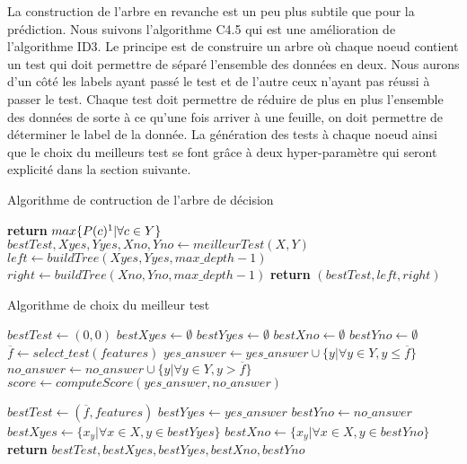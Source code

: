 \documentclass[french, 14pt]{memoir}
\begin{document}
La construction de l'arbre en revanche est un peu plus subtile que pour la prédiction. Nous suivons l'algorithme C4.5 qui est une amélioration de l'algorithme ID3. Le principe est de construire un arbre où chaque noeud contient un test qui doit permettre de séparé l'ensemble des données en deux. Nous aurons d'un côté les labels ayant passé le test et de l'autre ceux n'ayant pas réussi à passer le test. Chaque test doit permettre de réduire de plus en plus l'ensemble des données de sorte à ce qu'une fois arriver à une feuille, on doit permettre de déterminer le label de la donnée. La génération des tests à chaque noeud ainsi que le choix du meilleurs test se font grâce à deux hyper-paramètre qui seront explicité dans la section suivante. 

\begin{algorithm}
\begin{minipage}[t]{20cm}
\caption{Algorithme de contruction de l'arbre de décision}
\label{buildTree}
\begin{algorithmic}[1]
\State \textbf{return} $max\{P(c)\footnote{où P(c) est la probabilité d'apparition de la classe c dans Y}|\forall c \in Y\}$
\Else
\State $bestTest, Xyes, Yyes, Xno, Yno \gets meilleurTest(X, Y)$
\State $left \gets buildTree(Xyes, Yyes, max\_depth - 1)$
\State $right \gets buildTree(Xno, Yno, max\_depth - 1)$
\State \textbf{return} $(bestTest, left, right)$
\EndIf
\EndFunction
\end{algorithmic}
\end{minipage}
\end{algorithm}

\begin{algorithm}
\begin{minipage}[t]{20cm}
\caption{Algorithme de choix du meilleur test}
\label{getBestTest}
\begin{algorithmic}[1]
\State $bestTest \gets (0,0)$
\State $bestXyes \gets \emptyset$
\State $bestYyes \gets \emptyset$
\State $bestXno \gets \emptyset$
\State $bestYno \gets \emptyset$
\State $\overline{f} \gets select\_test(features)$
\State $yes\_answer \gets yes\_answer \cup \{y | \forall y \in Y, y \leq \overline{f} \}$
\State $no\_answer \gets no\_answer \cup \{y | \forall y \in Y, y > \overline{f} \}$
\State $score \gets computeScore(yes\_answer, no\_answer)$

\State $bestTest \gets (\overline{f}, features)$
\State $bestYyes \gets yes\_answer$
\State $bestYno \gets no\_answer$
 \State $bestXyes \gets \{x_y |\forall x \in X, y \in bestYyes\}$
 \State $bestXno \gets \{x_y |\forall x \in X, y \in bestYno\}$
\EndIf
\EndFor
\State \textbf{return} $bestTest, bestXyes, bestYyes, bestXno, bestYno$
\EndFunction
\end{algorithmic}
\end{minipage}
\end{algorithm}
\end{document}
